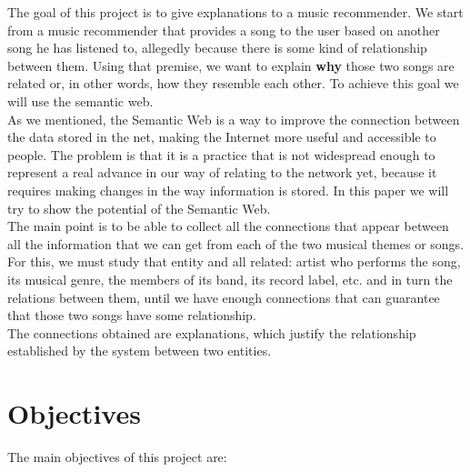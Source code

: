 The goal of this project is to give explanations to a music recommender. We start from a music recommender that provides a song to the user based on another song he has listened to, allegedly because there is some kind of relationship between them. Using that premise, we want to explain \textbf{why} those two songs are related or, in other words, how they resemble each other. To achieve this goal we will use the semantic web.\\

As we mentioned, the Semantic Web is a way to improve the connection between the data stored in the net, making the Internet more useful and accessible to people. The problem is that it is a practice that is not widespread enough to represent a real advance in our way of relating to the network yet, because it requires making changes in the way information is stored. In this paper we will try to show the potential of the Semantic Web.\\

The main point is to be able to collect all the connections that appear between all the information that we can get from each of the two musical themes or songs. For this, we must study that entity and all related: artist who performs the song, its musical genre, the members of its band, its record label, etc. and in turn the relations between them, until we have enough connections that can guarantee that those two songs have some relationship.\\

The connections obtained are explanations, which justify the relationship established by the system between two entities.\\

\section{Objectives}

The main objectives of this project are:

